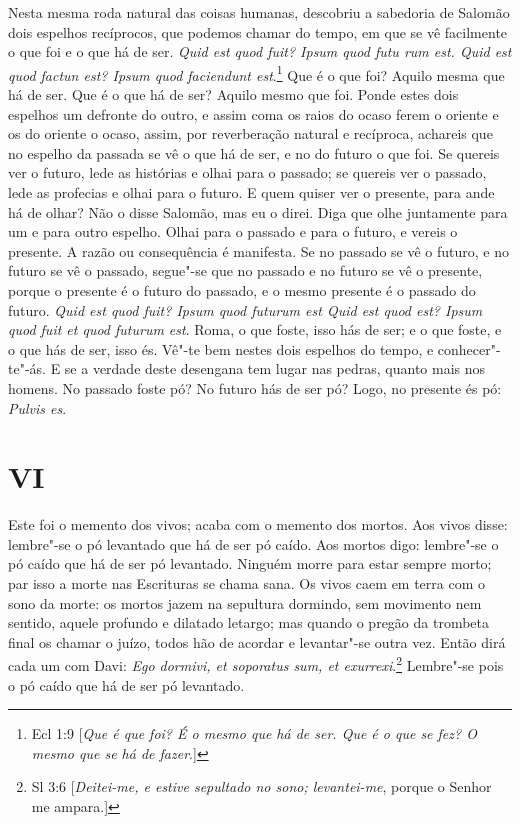 Nesta mesma roda natural das coisas humanas, descobriu a sabedoria de
Salomão dois espelhos recíprocos, que podemos chamar do tempo, em que se
vê facilmente o que foi e o que há de ser. \emph{Quid est quod fuit?
Ipsum quod futu rum est. Quid est quod factun est? Ipsum quod faciendunt
est}.\footnote{Ecl 1:9 [\emph{Que é que foi? É o mesmo que há de ser. Que é o que se fez? O mesmo que se há de fazer}.]} Que é o que foi? Aquilo mesma que há de ser. Que é o que há de
ser? Aquilo mesmo que foi. Ponde estes dois espelhos um
defronte do outro, e assim coma os raios do ocaso ferem o oriente e os
do oriente o ocaso, assim, por reverberação natural e recíproca,
achareis que no espelho da passada se vê o que há de ser, e no do futuro
o que foi. Se quereis ver o futuro, lede as histórias e olhai para o
passado; se quereis ver o passado, lede as profecias e olhai para o
futuro. E quem quiser ver o presente, para ande há de olhar? Não o disse Salomão, mas eu o direi. Diga que olhe juntamente para um e para outro espelho. Olhai para
o passado e para o futuro, e vereis o presente. A razão ou consequência
é manifesta. Se no passado se vê o futuro, e no futuro se vê o passado,
segue"-se que no passado e no futuro se vê o presente, porque o presente
é o futuro do passado, e o mesmo presente é o passado do futuro.
\emph{Quid est quod fuit? Ipsum quod futurum est Quid est quod est?
Ipsum quod fuit et quod futurum est}. Roma, o que foste, isso hás de
ser; e o que foste, e o que hás de ser, isso és. Vê"-te bem nestes dois
espelhos do tempo, e conhecer"-te"-ás. E se a verdade deste desengana tem
lugar nas pedras, quanto mais nos homens. No passado foste pó? No futuro
hás de ser pó? Logo, no presente és pó: \emph{Pulvis es}.

\section*{VI}

Este foi o memento dos vivos; acaba com o memento dos mortos. Aos vivos
disse: lembre"-se o pó levantado que há de ser pó caído. Aos mortos digo:
lembre"-se o pó caído que há de ser pó levantado. Ninguém morre para
estar sempre morto; par isso a morte nas Escrituras se chama sana. Os
vivos caem em terra com o sono da morte: os mortos jazem na sepultura
dormindo, sem movimento nem sentido, aquele profundo e dilatado letargo;
mas quando o pregão da trombeta final os chamar o juízo, todos hão de
acordar e levantar"-se outra vez. Então dirá cada um com Davi: \emph{Ego
dormivi, et soporatus sum, et exurrexi}.\footnote{Sl 3:6 [\emph{Deitei-me, e estive sepultado no sono; levantei-me}, porque o Senhor me ampara.]} Lembre"-se pois o pó caído
que há de ser pó levantado.

